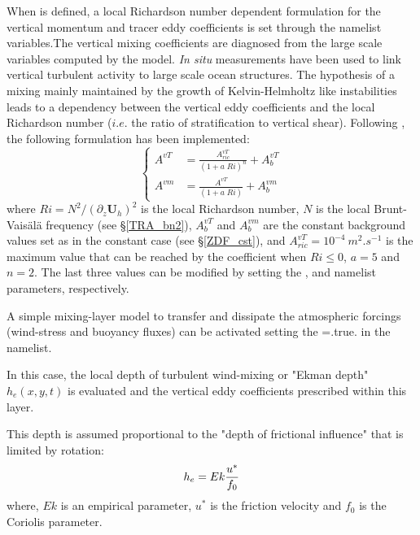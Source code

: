 When  is defined, a local Richardson number dependent formulation 
for the vertical momentum and tracer eddy coefficients is set through the   
namelist variables.The vertical mixing 
coefficients are diagnosed from the large scale variables computed by the model. 
\textit{In situ} measurements have been used to link vertical turbulent activity to 
large scale ocean structures. The hypothesis of a mixing mainly maintained by the 
growth of Kelvin-Helmholtz like instabilities leads to a dependency between the 
vertical eddy coefficients and the local Richardson number ($i.e.$ the 
ratio of stratification to vertical shear). Following \citet{Pacanowski_Philander_JPO81}, the following 
formulation has been implemented:
\begin{equation} \label{Eq_zdfric}
   \left\{      \begin{aligned}
         A^{vT} &= \frac {A_{ric}^{vT}}{\left( 1+a \; Ri \right)^n} + A_b^{vT}       \\
         A^{vm} &= \frac{A^{vT}        }{\left( 1+ a \;Ri  \right)   } + A_b^{vm}
   \end{aligned}    \right.
\end{equation}
where $Ri = N^2 / \left(\partial_z \textbf{U}_h \right)^2$ is the local Richardson 
number, $N$ is the local Brunt-Vais\"{a}l\"{a} frequency (see \S\ref{TRA_bn2}), 
$A_b^{vT} $ and $A_b^{vm}$ are the constant background values set as in the 
constant case (see \S\ref{ZDF_cst}), and $A_{ric}^{vT} = 10^{-4}~m^2.s^{-1}$ 
is the maximum value that can be reached by the coefficient when $Ri\leq 0$, 
$a=5$ and $n=2$. The last three values can be modified by setting the 
,  and  namelist parameters, respectively.

A simple mixing-layer model to transfer and dissipate the atmospheric
 forcings (wind-stress and buoyancy fluxes) can be activated setting 
the  =.true. in the namelist.

In this case, the local depth of turbulent wind-mixing or "Ekman depth"
 $h_{e}(x,y,t)$ is evaluated and the vertical eddy coefficients prescribed within this layer.

This depth is assumed proportional to the "depth of frictional influence" that is limited by rotation:
\begin{equation}
         h_{e} = Ek \frac {u^{*}} {f_{0}}  	\\
\end{equation}
where, $Ek$ is an empirical parameter, $u^{*}$ is the friction velocity and $f_{0}$ is the Coriolis 
parameter.

